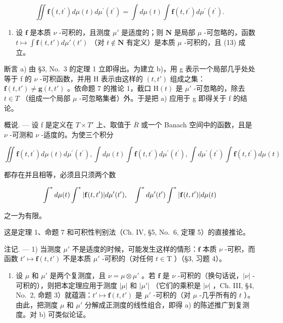 \[
\iint \mathbf {f} (t, t ^ {\prime}) d \mu (t) d \mu^ {\prime} (t ^ {\prime}) = \int d \mu (t) \int \mathbf {f} (t, t ^ {\prime}) d \mu^ {\prime} (t ^ {\prime}).\tag{13}
\]

\begin{enumerate}
\def\labelenumi{\alph{enumi})}
\setcounter{enumi}{1}
\tightlist
\item
  设 \(\mathbf{f}\) 是本质 \(\nu\) -可积的，且测度 \(\mu'\) 是适度的；则 \(\mathbf{N}\) 是局部 \(\mu\) -可忽略的，函数 \(t \mapsto \int \mathbf{f}(t, t') d\mu'(t')\) （对 \(t \notin \mathbf{N}\) 有定义）是本质 \(\mu\) -可积的，且 (13) 成立。
\end{enumerate}

断言 a) 由 §3, No.~3 的定理 1 立即得出。为建立 b)，用 g 表示一个局部几乎处处等于 f 的 \(\nu\) -可积函数，并用 H 表示由这样的 \((t, t')\) 组成之集：\(\mathbf{f}(t, t') \neq \mathbf{g}(t, t')\) 。依命题 7 的推论 1，截口 \(\mathrm{H}(t)\) 是 \(\mu'\) -可忽略的，除去 \(t \in T\) （组成一个局部 \(\mu\) -可忽略集者）外。于是把 a) 应用于 g 即得关于 f 的结论。

概说. --- 设 f 是定义在 \(T \times T'\) 上、取值于 \(\overline{R}\) 或一个 Banach 空间中的函数，且是 \(\nu\) -可测和 \(\nu\) -适度的。为使三个积分

\[
\iint \mathbf {f} (t, t ^ {\prime}) d \mu (t) d \mu^ {\prime} (t ^ {\prime}), \int d \mu (t) \int \mathbf {f} (t, t ^ {\prime}) d \mu^ {\prime} (t ^ {\prime}), \int d \mu^ {\prime} (t ^ {\prime}) \int \mathbf {f} (t, t ^ {\prime}) d \mu (t)
\]

都存在并且相等，必须且只须两个数

\[
\int^ {*} d \mu (t) \int^ {*} | {\bf f} (t, t ^ {\prime}) | d \mu^ {\prime} (t ^ {\prime}), \quad \int^ {*} d \mu^ {\prime} (t ^ {\prime}) \int^ {*} | {\bf f} (t, t ^ {\prime}) | d \mu (t)
\]

之一为有限。

这是定理 1、命题 7 和可积性判别法（Ch. IV, §5, No.~6, 定理 5）的直接推论。

注记. --- 1) 当测度 \(\mu'\) 不是适度的时候，可能发生这样的情形：\(\mathbf{f}\) 本质 \(\nu\) -可积，而函数 \(t' \mapsto \mathbf{f}(t, t')\) 不是本质 \(\mu'\) -可积的（对任何 \(t \in \mathrm{T}\) ）（§3, 习题 4）。

\begin{enumerate}
\def\labelenumi{\arabic{enumi})}
\setcounter{enumi}{1}
\tightlist
\item
  设 \(\mu\) 和 \(\mu'\) 是两个复测度，且 \(\nu = \mu \otimes \mu'\) 。若 \(\mathbf{f}\) 是 \(\nu\) -可积的（换句话说，\(|\nu|\) -可积的），则把本定理应用于测度 \(|\mu|\) 和 \(|\mu'|\) （它们的乘积是 \(|\nu|\) ，Ch. III, §4, No.~2, 命题 3）就蕴涵：\(t' \mapsto \mathbf{f}(t, t')\) 是 \(\mu'\) -可积的（对 \(\mu\) -几乎所有的 \(t\) ）。由此，把测度 \(\mu\) 和 \(\mu'\) 分解成正测度的线性组合，即得 a) 的陈述推广到复测度。对 b) 可类似论证。
\end{enumerate}

